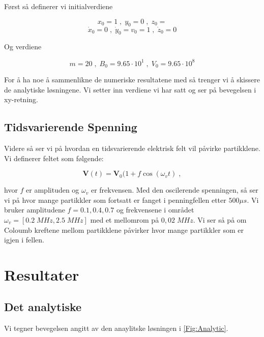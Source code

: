\documentclass[reprint,english,notitlepage, nofootinbib]{revtex4-1}  %
\begin{document}
Først så definerer vi initialverdiene

$$ x_0 = 1 \; , \; y_0 = 0 \; , \; z_0 = $$
$$ \dot{x}_0 = 0 \; , \; \dot{y}_0 = v_0 = 1 \; , \; \dot{z}_0 = 0$$

Og verdiene

$$ m = 20 \; , \; B_0 = 9.65 \cdot 10^1 \; , \; V_0 = 9.65 \cdot 10^8 $$

For å ha noe å sammenlikne de numeriske resultatene med så trenger vi å skissere de analytiske løsningene. Vi setter inn verdiene vi har satt og ser på bevegelsen i xy-retning. 

\subsection*{Tidsvarierende Spenning}

Videre så ser vi på hvordan en tidsvarierende elektrisk felt vil påvirke partikklene. Vi definerer feltet som følgende:

\begin{equation}\label{Vt}
\mathbf{V}(t)=\mathbf{V}_0(1+f\cos{(\omega_vt)} \; ,
\end{equation}

hvor $f$ er amplituden og $\omega_v$ er frekvensen. Med den oscilerende spenningen, så ser vi på hvor mange partikkler som fortsatt er fanget i penningfellen etter $500 \mu s$. Vi bruker amplitudene $f = {0.1, 0.4, 0.7}$ og frekvensene i området $\omega_v = \left [0.2 \; MHz, 2.5 \; MHz \right ]$ med et mellomrom på $0,02 \; MHz$. Vi ser så på om Coloumb kreftene mellom partikklene påvirker hvor mange partikkler som er igjen i fellen.

\section{Resultater}

\subsection*{Det analytiske}

Vi tegner bevegelsen angitt av den anaylitske løsningen i \autoref{Fig:Analytic}.
\end{document}
